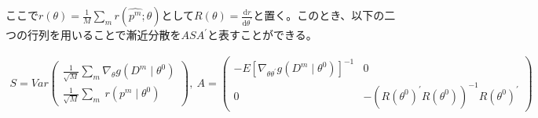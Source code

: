 \documentclass{jsarticle}
\begin{document}

ここで$r(\theta) = \frac{1}{M} \sum_m r(\hat{p^m} ; \theta)$として$R(\theta) = \frac{\mathrm{d}r}{\mathrm{d} \theta^{'}}$と置く。このとき、以下の二つの行列を用いることで漸近分散を$A S A^{'}$と表すことができる。

\begin{align*}
	S = Var\begin{pmatrix}
	\frac{1}{\sqrt{M}} \sum_m \nabla_{\theta} g(D^m \mid \theta^0)\\[8pt]
	\frac{1}{\sqrt{M}} \sum_m\ r(p^m \mid \theta^0)
	\end{pmatrix},\ 
	A = \begin{pmatrix}
	-E\left[ \nabla_{\theta \theta^{'}}g(D^m \mid \theta^0) \right]^{-1} & 0\\[8pt]
	0 & -\left( R(\theta^0)^{'} R(\theta^0) \right)^{-1} R(\theta^0)^{'}
	\end{pmatrix}
\end{align*}

\end{document}
